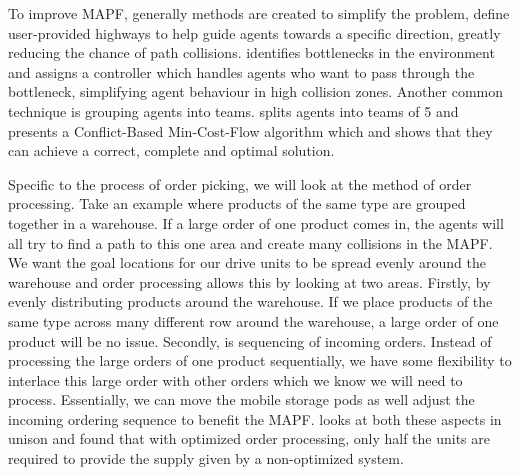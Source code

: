 \documentclass[a4paper,11pt]{article}
\begin{document}
To improve MAPF, generally methods are created to simplify the problem, \cite{cohen2016bounded} define user-provided highways to help guide agents towards a specific direction, greatly reducing the chance of path collisions. \cite{wilt2014spatially} identifies bottlenecks in the environment and assigns a controller which handles agents who want to pass through the bottleneck, simplifying agent behaviour in high collision zones. Another common technique is grouping agents into teams. \cite{ma2016optimal} splits agents into teams of 5 and presents a Conflict-Based Min-Cost-Flow algorithm which and shows that they can achieve a correct, complete and optimal solution.


Specific to the process of order picking, we will look at the method of order processing. Take an example where products of the same type are grouped together in a warehouse. If a large order of one product comes in, the agents will all try to find a path to this one area and create many collisions in the MAPF. We want the goal locations for our drive units to be spread evenly around the warehouse and order processing allows this by looking at two areas. Firstly, by evenly distributing products around the warehouse. If we place products of the same type across many different row around the warehouse, a large order of one product will be no issue. Secondly, is sequencing of incoming orders. Instead of processing the large orders of one product sequentially, we have some flexibility to interlace this large order with other orders which we know we will need to process. Essentially, we can move the mobile storage pods as well adjust the incoming ordering sequence to benefit the MAPF. \cite{boysen2017parts} looks at both these aspects in unison and found that with optimized order processing, only half the units are required to provide the supply given by a non-optimized system.


\end{document}
